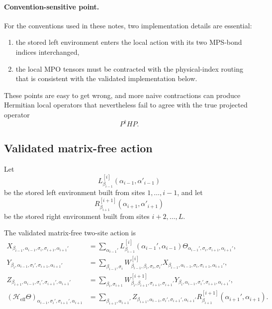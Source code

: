 \documentclass[aps,prb,onecolumn,nofootinbib]{revtex4-2}
\begin{document}
	\paragraph{Convention-sensitive point.}
	For the conventions used in these notes, two implementation details are essential:
	\begin{enumerate}
		\item the stored left environment enters the local action with its two MPS-bond
		indices interchanged,
		\item the local MPO tensors must be contracted with the physical-index routing that
		is consistent with the validated implementation below.
	\end{enumerate}
	These points are easy to get wrong, and more naive contractions can produce Hermitian
	local operators that nevertheless fail to agree with the true projected operator
	\[
	P^\dagger H P.
	\]
	
	\subsection{Validated matrix-free action}
	
	Let
	\[
	L^{[i]}_{\beta_{i-1}}(\alpha_{i-1},\alpha'_{i-1})
	\]
	be the stored left environment built from sites $1,\dots,i-1$, and let
	\[
	R^{[i+1]}_{\beta_{i+1}}(\alpha_{i+1},\alpha'_{i+1})
	\]
	be the stored right environment built from sites $i+2,\dots,L$.
	
	The validated matrix-free two-site action is
	\begin{align}
		X_{\beta_{i-1},\alpha_{i-1},\sigma_i,\sigma_{i+1},\alpha_{i+1}'}
		&=
		\sum_{\alpha_{i-1}'}
		L^{[i]}_{\beta_{i-1}}(\alpha_{i-1}',\alpha_{i-1})
		\Theta_{\alpha_{i-1}',\sigma_i,\sigma_{i+1},\alpha_{i+1}'},
		\label{eq:two-site-step1}
		\\
		Y_{\beta_i,\alpha_{i-1},\sigma_i',\sigma_{i+1},\alpha_{i+1}'}
		&=
		\sum_{\beta_{i-1},\sigma_i}
		W^{[i]}_{\beta_{i-1},\beta_i,\sigma_i,\sigma_i'}
		X_{\beta_{i-1},\alpha_{i-1},\sigma_i,\sigma_{i+1},\alpha_{i+1}'},
		\label{eq:two-site-step2}
		\\
		Z_{\beta_{i+1},\alpha_{i-1},\sigma_i',\sigma_{i+1}',\alpha_{i+1}'}
		&=
		\sum_{\beta_i,\sigma_{i+1}}
		W^{[i+1]}_{\beta_i,\beta_{i+1},\sigma_{i+1},\sigma_{i+1}'}
		Y_{\beta_i,\alpha_{i-1},\sigma_i',\sigma_{i+1},\alpha_{i+1}'},
		\label{eq:two-site-step3}
		\\
		(\mathcal{H}_{\mathrm{eff}}\Theta)_{\alpha_{i-1},\sigma_i',\sigma_{i+1}',\alpha_{i+1}}
		&=
		\sum_{\beta_{i+1},\alpha_{i+1}'}
		Z_{\beta_{i+1},\alpha_{i-1},\sigma_i',\sigma_{i+1}',\alpha_{i+1}'}
		R^{[i+1]}_{\beta_{i+1}}(\alpha_{i+1}',\alpha_{i+1}).
		\label{eq:two-site-step4}
	\end{align}
	
\end{document}
